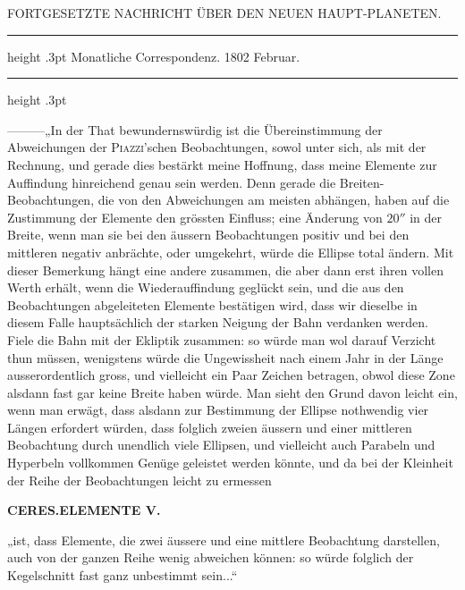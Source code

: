 \bigskip{}
\begin{center}\small
FORTGESETZTE NACHRICHT ÜBER DEN NEUEN HAUPT-PLANETEN.\par
[CERES.]\par
\end{center}
\begin{center}\parbox{.66\linewidth}{\centering\footnotesize\frenchspacing
\hrule height .3pt\relax\vspace{2.5pt}
Monatliche Correspondenz. 1802 Februar.\par
\vspace{2.5pt}\hrule height .3pt\relax
}\end{center}
—\quad —\quad —\quad „In der That bewundernswürdig ist die Übereinstimmung der Abweichungen der \textsc{Piazzi}'schen Beobachtungen, sowol unter sich, als mit der Rechnung, und gerade dies bestärkt meine Hoffnung, dass meine Elemente zur Auffindung hinreichend genau sein werden. Denn gerade die Breiten-Beobachtungen, die von den Abweichungen am meisten abhängen, haben auf die Zustimmung der Elemente den grössten Einfluss; eine Änderung von $20''$ in der Breite, wenn man sie bei den äussern Beobachtungen positiv und bei den mittleren negativ anbrächte, oder umgekehrt, würde die Ellipse total ändern. Mit dieser Bemerkung hängt eine andere zusammen, die aber dann erst ihren vollen Werth erhält, wenn die Wiederauffindung geglückt sein, und die aus den Beobachtungen abgeleiteten Elemente bestätigen wird, dass wir dieselbe in diesem Falle hauptsächlich der starken Neigung der Bahn verdanken werden. Fiele die Bahn mit der Ekliptik zusammen: so würde man wol darauf Verzicht thun müssen, wenigstens würde die Ungewissheit nach einem Jahr in der Länge ausserordentlich gross, und vielleicht ein Paar Zeichen betragen, obwol diese Zone alsdann fast gar keine Breite haben würde. Man sieht den Grund davon leicht ein, wenn man erwägt, dass alsdann zur Bestimmung der Ellipse nothwendig vier Längen erfordert würden, dass folglich zweien äussern und einer mittleren Beobachtung durch unendlich viele Ellipsen, und vielleicht auch Parabeln und Hyperbeln vollkommen Genüge geleistet werden könnte, und da bei der Kleinheit der Reihe der Beobachtungen leicht zu ermessen
\clearpage
\thispagestyle{empty}
\noindent{}%
\makebox[12mm][l]{}%
\parbox[t]{\dimexpr\linewidth-24mm\relax}{\centering\footnotesize\bfseries CERES.\quad ELEMENTE V.\par}%
\par\nobreak\medskip
\noindent „ist, dass Elemente, die zwei äussere und eine mittlere Beobachtung darstellen, auch von der ganzen Reihe wenig abweichen können: so würde folglich der Kegelschnitt fast ganz unbestimmt sein...“

